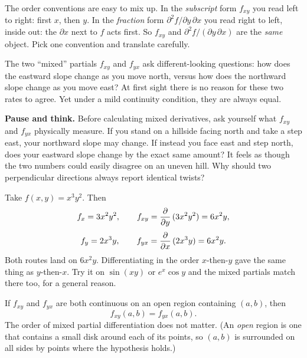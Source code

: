 \begin{trapbox}
The order conventions are easy to mix up. In the \emph{subscript} form $f_{xy}$ you
read left to right: first $x$, then $y$. In the \emph{fraction} form
$\partial^2 f/\partial y\,\partial x$ you read right to left, inside out: the $\partial x$ next
to $f$ acts first. So $f_{xy}$ and $\partial^2 f/(\partial y\,\partial x)$ are the \emph{same}
object. Pick one convention and translate carefully.
\end{trapbox}

The two ``mixed'' partials $f_{xy}$ and $f_{yx}$ ask different-looking questions: how does
the eastward slope change as you move north, versus how does the northward slope change as you
move east? At first sight there is no reason for these two rates to agree. Yet under a mild
continuity condition, they are always equal.

\begin{recoverybox}
\textbf{Pause and think.}
Before calculating mixed derivatives, ask yourself what $f_{xy}$ and $f_{yx}$ physically measure.
If you stand on a hillside facing north and take a step east, your northward slope may change.
If instead you face east and step north, does your eastward slope change by the exact same amount?
It feels as though the two numbers could easily disagree on an uneven hill. Why should two
perpendicular directions always report identical twists?
\end{recoverybox}

\begin{example}
\label{ch32:ex-mixed}
Take $f(x,y)=x^3 y^2$. Then
\[
   f_x = 3x^2 y^2, \qquad f_{xy} = \frac{\partial }{\partial y}\,(3x^2 y^2) = 6x^2 y,
\]
\[
   f_y = 2x^3 y, \qquad f_{yx} = \frac{\partial }{\partial x}\,(2x^3 y) = 6x^2 y.
\]
Both routes land on $6x^2 y$. Differentiating in the order $x$-then-$y$ gave the same thing as
$y$-then-$x$. Try it on $\sin(xy)$ or $e^{x}\cos y$ and the mixed partials match there too, for a
general reason.
\end{example}

\begin{theorem}
\label{ch32:thm-clairaut}
If $f_{xy}$ and $f_{yx}$ are both continuous on an open region containing $(a,b)$, then
\[
   f_{xy}(a,b) = f_{yx}(a,b).
\]
The order of mixed partial differentiation does not matter. (An \emph{open} region is one
that contains a small disk around each of its points, so $(a,b)$ is surrounded on all sides
by points where the hypothesis holds.)
\end{theorem}

